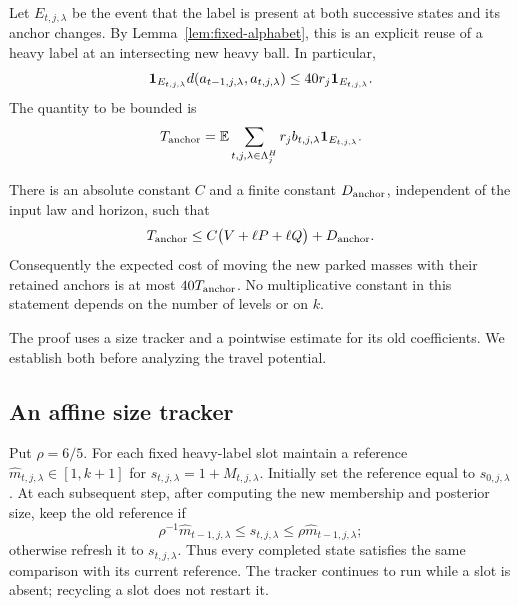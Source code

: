 Let $E_{t,j,\lambda}$ be the event that the label is present at both
successive states and its anchor changes.  By
Lemma~\ref{lem:fixed-alphabet}, this is an explicit reuse of a heavy
label at an intersecting new heavy ball.  In particular,
\begin{equation}\label{eq:retained-anchor-distance}
 \mathbf 1_{E_{t,j,\lambda}}
 d(a_{t-1,j,\lambda},a_{t,j,\lambda})
 \le 40r_j\mathbf 1_{E_{t,j,\lambda}}.
\end{equation}
The quantity to be bounded is
\begin{equation}\label{eq:anchor-travel-definition}
 T_{\rm anchor}
   =\mathbb E\sum_{t,j,\lambda\in\Lambda_j^H}
                  r_j b_{t,j,\lambda}\mathbf 1_{E_{t,j,\lambda}}.
\end{equation}

\begin{proposition}\label{prop:anchor-travel}
There is an absolute constant $C$ and a finite constant $D_{\rm anchor}$,
independent of the input law and horizon, such that
\begin{equation}\label{eq:anchor-travel-bound}
 T_{\rm anchor}\le C\bigl(V+\ell P+\ell Q\bigr)+D_{\rm anchor}.
\end{equation}
Consequently the expected cost of moving the new parked masses with
their retained anchors is at most $40T_{\rm anchor}$.  No multiplicative
constant in this statement depends on the number of levels or on $k$.
\end{proposition}

The proof uses a size tracker and a pointwise estimate for its old
coefficients.  We establish both before analyzing the travel potential.

\subsection{An affine size tracker}

Put $\rho=6/5$.  For each fixed heavy-label slot maintain a reference
$\widehat m_{t,j,\lambda}\in[1,k+1]$ for
$s_{t,j,\lambda}=1+M_{t,j,\lambda}$.  Initially set the reference equal
to $s_{0,j,\lambda}$.  At each subsequent step, after computing the new
membership and posterior size, keep the old reference if
\begin{equation}\label{eq:key-size-comparison}
 \rho^{-1}\widehat m_{t-1,j,\lambda}
       \le s_{t,j,\lambda}
       \le\rho\widehat m_{t-1,j,\lambda};
\end{equation}
otherwise refresh it to $s_{t,j,\lambda}$.  Thus every completed state
satisfies the same comparison with its current reference.  The tracker
continues to run while a slot is absent; recycling a slot does not
restart it.

